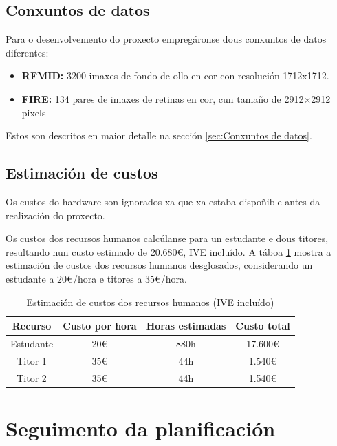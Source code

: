 \subsection{Conxuntos de datos}
\label{subsec:Conxuntos de datos}
Para o desenvolvemento do proxecto empregáronse dous conxuntos de datos diferentes:

\begin{itemize}
    \item \textbf{RFMID:} 3200 imaxes de fondo de ollo en cor con resolución 1712x1712.
    \item \textbf{FIRE:} 134 pares de imaxes de retinas en cor, cun tamaño de 2912×2912 pixels
\end{itemize}

Estos son descritos en maior detalle na sección \ref{sec:Conxuntos de datos}.

\subsection{Estimación de custos}
\label{subsec:Estimación de custos}

Os custos do hardware son ignorados xa que xa estaba dispoñible antes da realización do proxecto.

Os custos dos recursos humanos calcúlanse para un estudante e dous titores, resultando nun custo estimado de 20.680€, IVE incluído. A táboa \ref{tab:estimacion_custos} mostra a estimación de custos dos recursos humanos desglosados, considerando un estudante a 20€/hora e titores a 35€/hora.

\begin{table}[h]
\centering
\begin{tabular}{|c|c|c|c|}
\hline
\textbf{Recurso} & \textbf{Custo por hora} & \textbf{Horas estimadas} & \textbf{Custo total} \\ \hline
Estudante & 20€ & 880h & 17.600€ \\ \hline
Titor 1 & 35€ & 44h & 1.540€ \\ \hline
Titor 2 & 35€ & 44h & 1.540€ \\ \hline
\end{tabular}
\caption{Estimación de custos dos recursos humanos (IVE incluído)}
\label{tab:estimacion_custos}
\end{table}

\section{Seguimento da planificación}
\label{sec:Seguimento da planificación}

